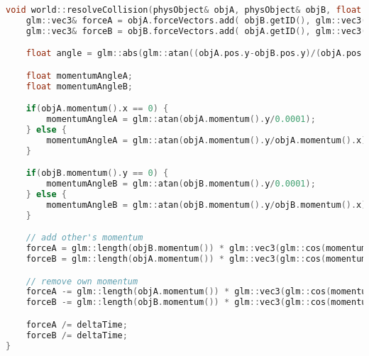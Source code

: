 \documentclass[12pt]{article}
\begin{document}
\lstset{style=mystyle}

\begin{lstlisting}[language=C++]
void world::resolveCollision(physObject& objA, physObject& objB, float deltaTime) {
    glm::vec3& forceA = objA.forceVectors.add( objB.getID(), glm::vec3(0.0f) );
    glm::vec3& forceB = objB.forceVectors.add( objA.getID(), glm::vec3(0.0f) );

    float angle = glm::abs(glm::atan((objA.pos.y-objB.pos.y)/(objA.pos.x-objB.pos.x)));

    float momentumAngleA;
    float momentumAngleB;

    if(objA.momentum().x == 0) {
        momentumAngleA = glm::atan(objA.momentum().y/0.0001);
    } else {
        momentumAngleA = glm::atan(objA.momentum().y/objA.momentum().x);
    }

    if(objB.momentum().y == 0) {
        momentumAngleB = glm::atan(objB.momentum().y/0.0001);
    } else {
        momentumAngleB = glm::atan(objB.momentum().y/objB.momentum().x);
    }

    // add other's momentum
    forceA = glm::length(objB.momentum()) * glm::vec3(glm::cos(momentumAngleB - angle), glm::sin(momentumAngleB - angle), 0.0f); 
    forceB = glm::length(objA.momentum()) * glm::vec3(glm::cos(momentumAngleA - angle), glm::sin(momentumAngleA - angle), 0.0f); 

    // remove own momentum
    forceA -= glm::length(objA.momentum()) * glm::vec3(glm::cos(momentumAngleA - angle), glm::sin(momentumAngleA - angle), 0.0f);
    forceB -= glm::length(objB.momentum()) * glm::vec3(glm::cos(momentumAngleB - angle), glm::sin(momentumAngleB - angle), 0.0f);

    forceA /= deltaTime;
    forceB /= deltaTime;
}
    
\end{lstlisting}
\end{document}
